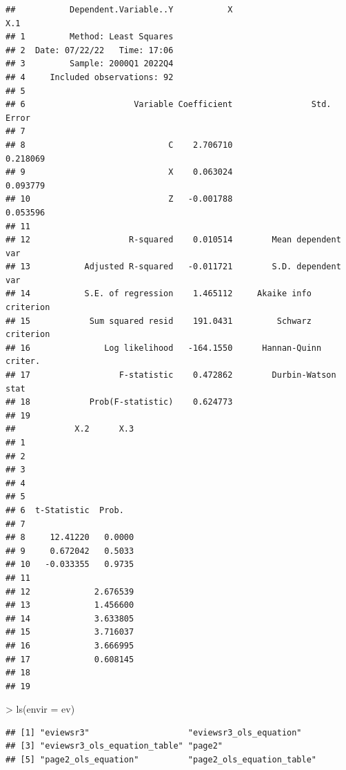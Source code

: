 \documentclass[
]{article}
\newenvironment{Shaded}{\begin{snugshade}}{\end{snugshade}}
\newcommand{\AttributeTok}[1]{\textcolor[rgb]{0.77,0.63,0.00}{#1}}
\newcommand{\FunctionTok}[1]{\textcolor[rgb]{0.00,0.00,0.00}{#1}}
\newcommand{\NormalTok}[1]{#1}
\newcommand{\SpecialCharTok}[1]{\textcolor[rgb]{0.00,0.00,0.00}{#1}}
\begin{document}
\begin{verbatim}
##           Dependent.Variable..Y           X                       X.1
## 1         Method: Least Squares                                      
## 2  Date: 07/22/22   Time: 17:06                                      
## 3         Sample: 2000Q1 2022Q4                                      
## 4     Included observations: 92                                      
## 5                                                                    
## 6                      Variable Coefficient                Std. Error
## 7                                                                    
## 8                             C    2.706710                  0.218069
## 9                             X    0.063024                  0.093779
## 10                            Z   -0.001788                  0.053596
## 11                                                                   
## 12                    R-squared    0.010514        Mean dependent var
## 13           Adjusted R-squared   -0.011721        S.D. dependent var
## 14           S.E. of regression    1.465112     Akaike info criterion
## 15            Sum squared resid    191.0431         Schwarz criterion
## 16               Log likelihood   -164.1550      Hannan-Quinn criter.
## 17                  F-statistic    0.472862        Durbin-Watson stat
## 18            Prob(F-statistic)    0.624773                          
## 19                                                                   
##            X.2      X.3
## 1                      
## 2                      
## 3                      
## 4                      
## 5                      
## 6  t-Statistic  Prob.  
## 7                      
## 8     12.41220   0.0000
## 9     0.672042   0.5033
## 10   -0.033355   0.9735
## 11                     
## 12             2.676539
## 13             1.456600
## 14             3.633805
## 15             3.716037
## 16             3.666995
## 17             0.608145
## 18                     
## 19
\end{verbatim}

\begin{Shaded}
\begin{Highlighting}[]
\SpecialCharTok{\textgreater{}} \FunctionTok{ls}\NormalTok{(}\AttributeTok{envir =}\NormalTok{ ev)}
\end{Highlighting}
\end{Shaded}

\begin{verbatim}
## [1] "eviewsr3"                    "eviewsr3_ols_equation"      
## [3] "eviewsr3_ols_equation_table" "page2"                      
## [5] "page2_ols_equation"          "page2_ols_equation_table"
\end{verbatim}
\end{document}
